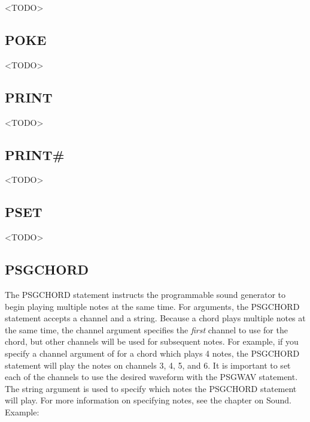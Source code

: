 <TODO>

\subsection{POKE}

<TODO>

\subsection{PRINT}

<TODO>

\subsection{PRINT\#}

<TODO>

\subsection{PSET}

<TODO>

\subsection{PSGCHORD}

The {\ttfamily PSGCHORD} statement instructs the programmable sound generator
to begin playing multiple notes at the same time.  For arguments, the
{\ttfamily PSGCHORD} statement accepts a channel and a string.  Because a chord
plays multiple notes at the same time, the channel argument specifies the
\emph{first} channel to use for the chord, but other channels will be used for
subsequent notes.  For example, if you specify a channel argument of {} for a chord which plays 4 notes, the {\ttfamily PSGCHORD} statement will
play the notes on channels 3, 4, 5, and 6.  It is important to set each of the
channels to use the desired waveform with the {\ttfamily PSGWAV} statement.
The string argument is used to specify which notes the {\ttfamily PSGCHORD}
statement will play.  For more information on specifying notes, see the chapter
on Sound.\\

Example:\\


